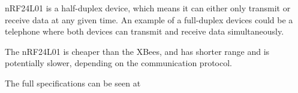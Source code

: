 nRF24L01 is a half-duplex device, which means it can either only transmit or receive data at any given time. An example of a full-duplex devices could be a telephone where both devices can transmit and receive data simultaneously.

The nRF24L01 is cheaper than the XBees, and has shorter range and is potentially slower, depending on the communication protocol.

The full specifications can be seen at\cite{nf24datasheet}

